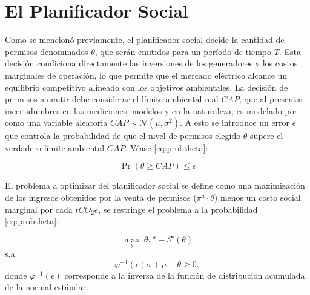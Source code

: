 \section{El Planificador Social}
Como se mencionó previamente, el planificador social decide la cantidad de permisos denominados $\theta$, que serán emitidos para un período de tiempo $T$. Esta decisión condiciona directamente las inversiones de los generadores y los costos marginales de operación, lo que permite que el mercado eléctrico alcance un equilibrio competitivo alineado con los objetivos ambientales. La decisión de permisos a emitir debe considerar el límite ambiental real $CAP$, que al presentar incertidumbres en las mediciones, modelos y en la naturaleza, es modelado por  como una variable aleatoria $CAP \sim \mathcal{N}(\mu,\sigma^2)$. A esto se introduce un error $\epsilon$ que controla la probabilidad de que el nivel de permisos elegido $\theta$ supere el verdadero límite ambiental $CAP$. Véase \ref{eq:probtheta}:

\begin{equation}
\label{eq:probtheta}
\Pr(\theta \ge CAP) \le \epsilon
\end{equation}

El problema a optimizar del planificador social se define como una maximización de los ingresos obtenidos por la venta de permisos ($\pi^a\cdot\theta$) menos un costo social marginal por cada $tCO_2e$, se restringe el problema a la probabilidad \ref{eq:probtheta}:

\begin{equation}
\max_{\theta} \ \theta \pi^a - \mathcal{F}(\theta)
\label{eq:objsubamigo}
\end{equation}
s.a.
\begin{equation}
\label{eq:restprobsub}
\varphi^{-1}(\epsilon)\sigma + \mu - \theta \ge 0,
\end{equation}
donde $\varphi^{-1}(\epsilon)$ corresponde a la inversa de la función de distribución acumulada de la normal estándar.

